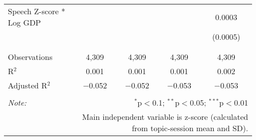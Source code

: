 \begin{table}[!htbp]
\begin{tabular}{@{\extracolsep{5pt}}lcccc}
 Speech Z-score * Log GDP &  &  &  & 0.0003 \\ 
  &  &  &  & (0.0005) \\ 
  & & & & \\ 
\hline \\[-1.8ex] 
Observations & 4,309 & 4,309 & 4,309 & 4,309 \\ 
R$^{2}$ & 0.001 & 0.001 & 0.001 & 0.002 \\ 
Adjusted R$^{2}$ & $-$0.052 & $-$0.052 & $-$0.053 & $-$0.053 \\ 
\hline 
\hline \\[-1.8ex] 
\textit{Note:}  & \multicolumn{4}{r}{$^{*}$p$<$0.1; $^{**}$p$<$0.05; $^{***}$p$<$0.01} \\ 
 & \multicolumn{4}{r}{Main independent variable is z-score (calculated from topic-session mean and SD).} \\ 
\end{tabular} 
\end{table} 
